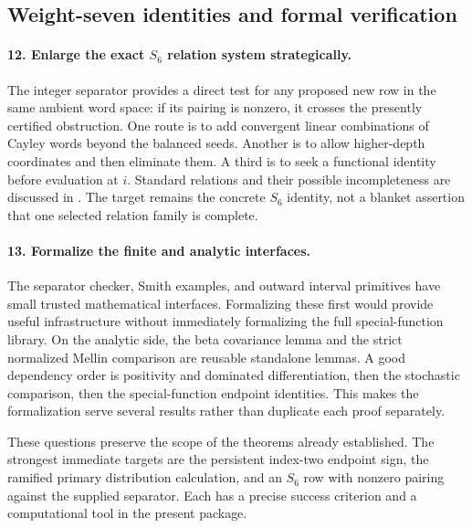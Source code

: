 \documentclass[11pt,a4paper]{article}
\numberwithin{equation}{section}
\theoremstyle{definition}
\theoremstyle{remark}
\begin{document}
\subsection{Weight-seven identities and formal verification}

\paragraph{12. Enlarge the exact $S_6$ relation system strategically.}
The integer separator provides a direct test for any proposed new row
in the same ambient word space:
if its pairing is nonzero, it crosses the presently certified
obstruction. One route is to add convergent linear combinations of
Cayley words beyond the balanced seeds. Another is to allow
higher-depth coordinates and then eliminate them. A third is to seek
a functional identity before evaluation at $i$. Standard relations
and their possible incompleteness are discussed in \cite{zhao,racinet}.
The target remains the concrete $S_6$ identity, not a blanket assertion
that one selected relation family is complete.

\paragraph{13. Formalize the finite and analytic interfaces.}
The separator checker, Smith examples, and outward interval primitives
have small trusted mathematical interfaces. Formalizing these first
would provide useful infrastructure without immediately formalizing
the full special-function library. On the analytic side, the beta
covariance lemma and the strict normalized Mellin comparison are
reusable standalone lemmas. A good dependency order is positivity and
dominated differentiation, then the stochastic comparison, then the
special-function endpoint identities. This makes the formalization
serve several results rather than duplicate each proof separately.

These questions preserve the scope of the theorems already established.
The strongest immediate targets are the persistent index-two endpoint
sign, the ramified primary distribution calculation, and an $S_6$ row
with nonzero pairing against the supplied separator. Each has a precise
success criterion and a computational tool in the present package.

\end{document}
